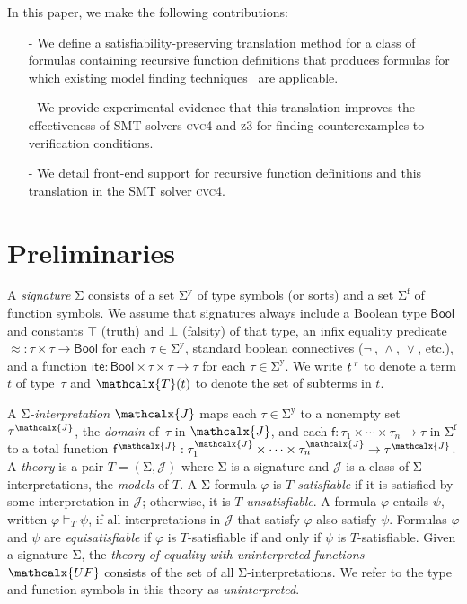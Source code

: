 \documentclass[runningheads,a4paper]{llncs}
\newcommand{\con}[1]{\mathsf{#1}}
\let\oldSigma=\Sigma
\def\Sigma{\mathrm{\oldSigma}}
\let\oldneg=\neg
\def\neg{\oldneg\:}
\let\oldvee=\vee
\def\vee{\mathrel{\oldvee}}
\let\oldwedge=\wedge
\def\wedge{\mathrel{\oldwedge}}
\newcommand{\cvc}{\textsc{cvc}{\small 4}\xspace}
\newcommand{\ziii}{\textsc{z}{\small 3}\xspace}
\newcommand{\teq}{\approx}
\newcommand{\terms}{\mathcalx{T}}
\newcommand{\I}{\mathcalx{J}} %
\newcommand{\ssorts}[1]{#1^\mathrm{y}}
\newcommand{\sfuns}[1]{#1^\mathrm{f}}
\newcommand{\sfundefs}[1]{#1^\mathrm{df}}
\newcommand\ty[1]{\con{#1}}
\newcommand{\Bool}{\ty{Bool}}
\newcommand{\ltrue}{\top}
\newcommand{\lfalse}{\bot}
\newcommand{\lite}{\con{ite}}
\newcommand{\vthinspace}{\kern+0.083333em}
\newcommand{\typ}[1]{^{\vthinspace #1}}
\newcommand{\Mo}{{\mathcal{\!J\!}}}
\newcommand{\euf}{\ensuremath{\mathcalx{UF}}\xspace}
\begin{document}
In this paper, we make the following contributions:
\begin{itemize}
\item[-] We define a satisfiability-preserving translation method for a class of formulas containing recursive function definitions
that produces formulas for which existing model finding techniques~\cite{GeDeM-CAV-09, ReyEtAl-1-RR-13} are applicable.
\item[-] We provide experimental evidence that this translation improves the effectiveness of SMT solvers \cvc and \ziii for finding counterexamples to verification conditions.
\item[-] We detail front-end support for recursive function definitions and this translation in the SMT solver \cvc.
\end{itemize}

\section{Preliminaries}
\label{sec:prelim}

A \emph{signature} $\Sigma$ consists of 
a set $\ssorts{\Sigma}$ of type symbols (or sorts) and
a set $\sfuns{\Sigma}$ of function symbols.
We assume that signatures always include a Boolean type $\Bool$ and constants 
$\ltrue$ (truth) and $\lfalse$ (falsity) of that type,
an infix equality predicate ${\teq} : \tau \times \tau \to \Bool$
for each $\tau \in \ssorts{\Sigma}$,
standard boolean connectives ($\neg$, $\wedge$, $\vee$, etc.),
and a function $\lite : \Bool \times \tau \times \tau \rightarrow \tau$ for each $\tau \in \ssorts{\Sigma}$.
We write $t\typ{\tau}$ to denote a term $t$ of type~$\tau$ and
$\terms( t )$ to denote the set of subterms in $t$.

A \emph{$\Sigma$-interpretation $\I$} %
maps each $\tau \in \ssorts{\Sigma}$ to a nonempty set $\tau^\I$,
the \emph{domain} of~$\tau$ in $\I$,
and each $\con{f} : \tau_1 \times \cdots \times \tau_n \rightarrow \tau$ in
$\sfuns{\Sigma}$ 
to a total function $\con{f}^\I : \tau_1^\I \times \cdots \times \tau_n^\I \rightarrow \tau^\I$.
A \emph{theory} is a pair $T = (\Sigma, \Mo)$ where 
$\Sigma$ is a signature and  $\Mo$ is a class of $\Sigma$-interpretations,
the \emph{models} of $T$.
A $\Sigma$-formula $\varphi$ is 
\emph{$T$-satisfiable}
if it is satisfied by some interpretation in $\Mo$;
otherwise, it is \emph{$T$-unsatisfiable}.
A formula $\varphi$ entails $\psi$, written $\varphi \models_T \psi$,
if all interpretations in $\Mo$ that satisfy $\varphi$ also satisfy $\psi$.
Formulas $\varphi$ and $\psi$ are \emph{equisatisfiable} if
$\varphi$ is $T$-satisfiable if and only if $\psi$ is $T$-satisfiable.
Given a signature $\Sigma$,
the \emph{theory of equality with uninterpreted functions} \euf
consists of the set of all $\Sigma$-interpretations.
We refer to the type and function symbols in this theory as \emph{uninterpreted}.
\end{document}

